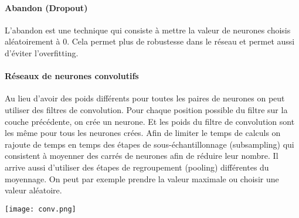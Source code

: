 \paragraph{Abandon (Dropout)}
L'abandon est une technique qui consiste à mettre la valeur de neurones choisis aléatoirement à 0. Cela permet plus de robustesse dans le réseau et permet aussi d'éviter l'overfitting.

\paragraph{Réseaux de neurones convolutifs}
Au lieu d'avoir des poids différents pour toutes les paires de neurones on peut utiliser des filtres de convolution. Pour chaque position possible du filtre sur la couche précédente, on crée un neurone. Et les poids du filtre de convolution sont les même pour tous les neurones crées. Afin de limiter le temps de calculs on rajoute de temps en temps des étapes de sous-échantillonnage (subsampling) qui consistent à moyenner des carrés de neurones afin de réduire leur nombre. Il arrive aussi d'utiliser des étapes de regroupement (pooling) différentes du moyennage. On peut par exemple prendre la valeur maximale ou choisir une valeur aléatoire.
\begin{center}
	\texttt{[image: conv.png]}
\end{center}